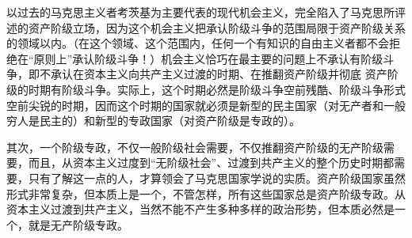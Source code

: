 以过去的马克思主义者考茨基为主要代表的现代机会主义，完全陷入了马克思所评述的{\kaishu 资产阶级}立场，因为这个机会主义把承认阶级斗争的范围局限于资产阶级关系的领域以内。（在这个领域、这个范围内，任何一个有知识的自由主义者都不会拒绝在“原则上”承认阶级斗争！）机会主义恰巧在最主要的问题上{\kaishu 不承认}有阶级斗争，即不承认在资本主义向共产主义{\kaishu 过渡}的时期、在{\kaishu 推翻}资产阶级并彻底 资产阶级的时期有阶级斗争。实际上，这个时期必然是阶级斗争空前残酷、阶级斗争形式空前尖锐的时期，因而这个时期的国家就必须是{\kaishu 新型}的民主国家（对无产者和一般穷人是民主的）和{\kaishu 新型}的专政国家（对资产阶级是专政的）。

其次，一个阶级专政，不仅一般阶级社会需要，不仅推翻资产阶级的{\kaishu 无产阶级}需要，而且，从资本主义过度到“无阶级社会”、过渡到共产主义的整个历史时期都需要，只有了解这一点的人，才算领会了马克思国家学说的实质。资产阶级国家虽然形式非常复杂，但本质上是一个，不管怎样，所有这些国家总是{\kaishu 资产阶级专政}。从资本主义过渡到共产主义，当然不能不产生多种多样的政治形势，但本质必然是一个，就是{\kaishu 无产阶级专政}。












